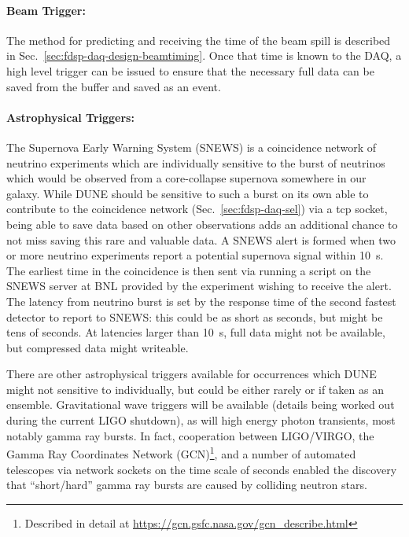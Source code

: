 \paragraph{Beam Trigger:} The method for predicting and receiving the
time of the beam spill is described in
Sec.~\ref{sec:fdsp-daq-design-beamtiming}.  Once that time is known to
the DAQ, a high level trigger can be issued to ensure that the necessary
full data can be saved from the buffer and saved as an event.

\paragraph{Astrophysical Triggers:} The Supernova Early Warning System
(SNEWS) is a coincidence network of neutrino experiments which are
individually sensitive to the burst of neutrinos which would be observed
from a core-collapse supernova somewhere in our galaxy.  While DUNE
should be sensitive to such a burst on its own able to contribute to the
coincidence network (Sec.~\ref{sec:fdsp-daq-sel}) via a tcp socket,
being able to save data based on other observations adds an additional
chance to not miss saving this rare and valuable data.  A SNEWS alert is
formed when two or more neutrino experiments report a potential
supernova signal within \SI{10}{s}.  The earliest time in the
coincidence is then sent via running a script on the SNEWS server at BNL
provided by the experiment wishing to receive the alert.  The latency
from neutrino burst is set by the response time of the second fastest
detector to report to SNEWS: this could be as short as seconds, but
might be tens of seconds.  At latencies larger than \SI{10}{s}, full
data might not be available, but compressed data might writeable.

There are other astrophysical triggers available for occurrences which
DUNE might not sensitive to individually, but could be either rarely or
if taken as an ensemble.  Gravitational wave triggers will be available
(details being worked out during the current LIGO shutdown), as will
high energy photon transients, most notably gamma ray bursts.  In fact,
cooperation between LIGO/VIRGO, the Gamma Ray Coordinates Network
(GCN)\footnote{Described in detail at
  \url{https://gcn.gsfc.nasa.gov/gcn_describe.html}}, and a number of
automated telescopes via network sockets on the time scale of seconds
enabled the discovery that ``short/hard'' gamma ray bursts are caused by
colliding neutron stars\cite{kilonova}.
